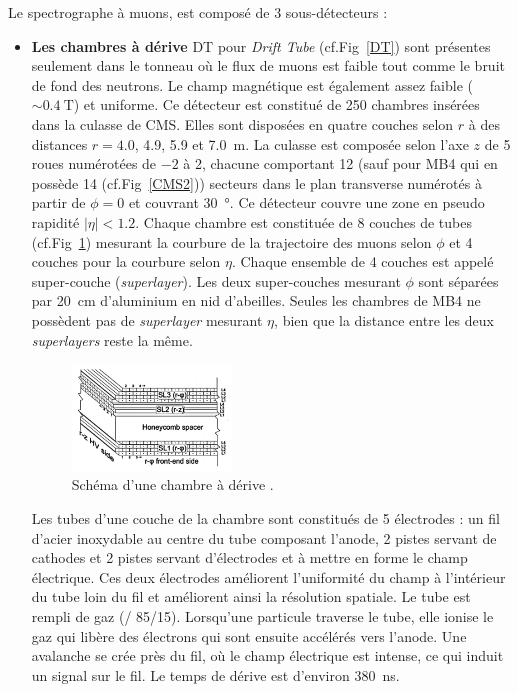 Le spectrographe à muons, est composé de \num{3} sous-détecteurs :
\begin{itemize}[label=$\bullet$]
	\item \textbf{Les chambres à dérive} DT pour \textit{Drift Tube} (cf.Fig~\ref{DT}) sont présentes seulement dans le tonneau où le flux de muons est faible tout comme le bruit de fond des neutrons. Le champ magnétique est également assez faible ($\sim\SI{0.4}{\tesla}$) et uniforme. Ce détecteur est constitué de \num{250} chambres insérées dans la culasse de CMS. Elles sont disposées en quatre couches selon $r$ à des distances $r=\num{4.0}$, \num{4.9}, \num{5.9} et \SI{7.0}{\meter}. La culasse est composée selon l'axe $z$ de \num{5} roues numérotées de $-\num{2}$ à \num{2}, chacune comportant \num{12} (sauf pour MB4 qui en possède \num{14} (cf.Fig~\ref{CMS2})) secteurs dans le plan transverse numérotés à partir de $\phi=\num{0}$ et couvrant \SI{30}{\degree}. Ce détecteur couvre une zone en pseudo rapidité $|\eta|<\num{1.2}$. Chaque chambre est constituée de \num{8} couches de tubes (cf.Fig~\ref{DT1}) mesurant la courbure de la trajectoire des muons selon $\phi$ et \num{4} couches pour la courbure selon $\eta$. Chaque ensemble de \num{4} couches est appelé super-couche (\textit{superlayer}). Les deux super-couches mesurant $\phi$ sont séparées par \SI{20}{\centi\meter} d'aluminium en nid d'abeilles. Seules les chambres de MB4 ne possèdent pas de \textit{superlayer} mesurant $\eta$, bien que la distance entre les deux \textit{superlayers} reste la même.
	\begin{figure}[ht!]
		\centering
		\includegraphics[width=0.40\textwidth]{CMS/DTchamber.png}
		\captionsetup{type=figure}\caption{Schéma d'une chambre à dérive \cite{Chatrchyan:1223944}.}
		\label{DT1}
	\end{figure}

    Les tubes d'une couche de la chambre sont constitués de \num{5} électrodes : un fil d'acier inoxydable au centre du tube composant l'anode, \num{2} pistes servant de cathodes et \num{2} pistes servant d'électrodes et à mettre en forme le champ électrique. Ces deux électrodes améliorent l'uniformité du champ à l'intérieur du tube loin du fil et améliorent ainsi la résolution spatiale. Le tube est rempli de gaz (/ \num{85}/\num{15}). Lorsqu'une particule traverse le tube, elle ionise le gaz qui libère des électrons qui sont ensuite accélérés vers l'anode. Une avalanche se crée près du fil, où le champ électrique est intense, ce qui induit un signal sur le fil. Le temps de dérive est d'environ \SI{380}{\nano\second}. 
    

\end{itemize}
